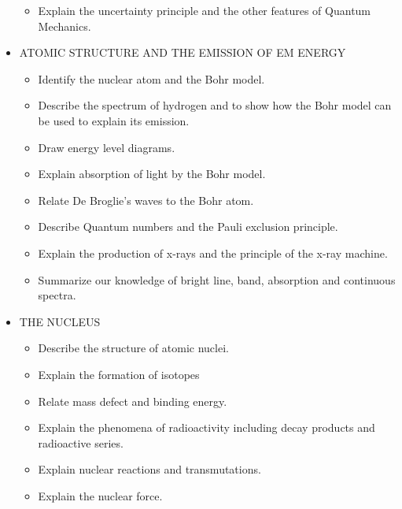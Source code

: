 \documentclass{article}
\begin{document}
\begin{itemize}
\begin{itemize}
\item Explain the uncertainty principle and the other features of Quantum Mechanics.

\end{itemize}

\item ATOMIC STRUCTURE AND THE EMISSION OF EM ENERGY
%
\begin{itemize}

\item Identify the nuclear atom and the Bohr model.

\item Describe the spectrum of hydrogen and to show how the Bohr model can be used to explain its emission.

\item Draw energy level diagrams.

\item Explain absorption of light by the Bohr model.

\item Relate De Broglie's waves to the Bohr atom.

\item Describe Quantum numbers and the Pauli exclusion principle.

\item Explain the production of x-rays and the principle of the x-ray machine.

\item Summarize our knowledge of bright line, band, absorption and continuous spectra.

\end{itemize}

\item THE NUCLEUS
%
\begin{itemize}

\item Describe the structure of atomic nuclei.

\item Explain the formation of isotopes

\item Relate mass defect and binding energy.

\item Explain the phenomena of radioactivity including decay products and radioactive series.

\item Explain nuclear reactions and transmutations.

\item Explain the nuclear force.


\end{itemize}
\end{itemize}
\end{document}
